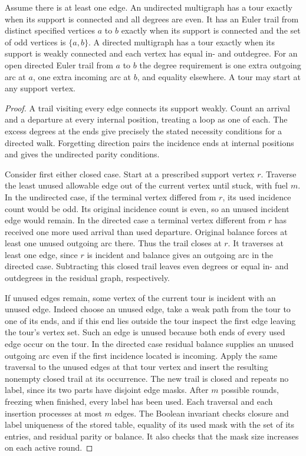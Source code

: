 \begin{theorem}\leavevmode\label{steulertheorem}
Assume there is at least one edge. An undirected multigraph has a tour exactly when its support is connected and all degrees are even. It has an Euler trail from distinct specified vertices $a$ to $b$ exactly when its support is connected and the set of odd vertices is $\{a,b\}$. A directed multigraph has a tour exactly when its support is weakly connected and each vertex has equal in- and outdegree. For an open directed Euler trail from $a$ to $b$ the degree requirement is one extra outgoing arc at $a$, one extra incoming arc at $b$, and equality elsewhere. A tour may start at any support vertex.
\end{theorem}
\begin{proof}
A trail visiting every edge connects its support weakly. Count an arrival and a departure at every internal position, treating a loop as one of each. The excess degrees at the ends give precisely the stated necessity conditions for a directed walk. Forgetting direction pairs the incidence ends at internal positions and gives the undirected parity conditions.

Consider first either closed case. Start at a prescribed support vertex $r$. Traverse the least unused allowable edge out of the current vertex until stuck, with fuel $m$. In the undirected case, if the terminal vertex differed from $r$, its used incidence count would be odd. Its original incidence count is even, so an unused incident edge would remain. In the directed case a terminal vertex different from $r$ has received one more used arrival than used departure. Original balance forces at least one unused outgoing arc there. Thus the trail closes at $r$. It traverses at least one edge, since $r$ is incident and balance gives an outgoing arc in the directed case. Subtracting this closed trail leaves even degrees or equal in- and outdegrees in the residual graph, respectively.

If unused edges remain, some vertex of the current tour is incident with an unused edge. Indeed choose an unused edge, take a weak path from the tour to one of its ends, and if this end lies outside the tour inspect the first edge leaving the tour's vertex set. Such an edge is unused because both ends of every used edge occur on the tour. In the directed case residual balance supplies an unused outgoing arc even if the first incidence located is incoming. Apply the same traversal to the unused edges at that tour vertex and insert the resulting nonempty closed trail at its occurrence. The new trail is closed and repeats no label, since its two parts have disjoint edge masks. After $m$ possible rounds, freezing when finished, every label has been used. Each traversal and each insertion processes at most $m$ edges. The Boolean invariant checks closure and label uniqueness of the stored table, equality of its used mask with the set of its entries, and residual parity or balance. It also checks that the mask size increases on each active round.


\end{proof}
